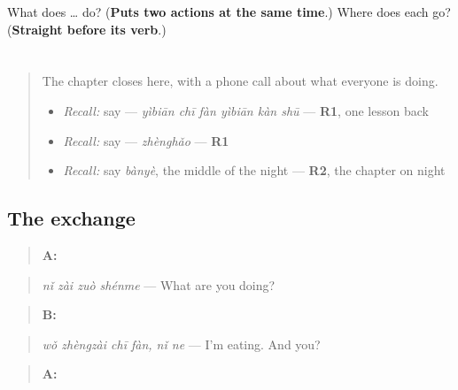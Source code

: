 \begin{tcolorbox}[breakable,colback=teal!4,colframe=teal!35!black,title={Before you move on}]
What does  …  do? (\textbf{Puts two actions at the same time}.) Where does each  go? (\textbf{Straight before its verb}.)
\end{tcolorbox}
\section[Practice]{}

\label{lesson:ZH-C149-practice}



\begin{quote}
The chapter closes here, with a phone call about what everyone is doing.

\begin{itemize}
\raggedright
  \item \emph{Recall:} say  — \emph{yìbiān chī fàn yìbiān kàn shū} — \textbf{R1}, one lesson back
  \item \emph{Recall:} say  — \emph{zhènghǎo} — \textbf{R1}
  \item \emph{Recall:} say \emph{bànyè}, the middle of the night — \textbf{R2}, the chapter on night
\end{itemize}
\end{quote}

\subsection*{The exchange}
\begin{quote}
\textbf{A:} 
\end{quote}

\begin{quote}
\emph{nǐ zài zuò shénme} — What are you doing?
\end{quote}

\begin{quote}
\textbf{B:}  
\end{quote}

\begin{quote}
\emph{wǒ zhèngzài chī fàn, nǐ ne} — I'm eating. And you?
\end{quote}

\begin{quote}
\textbf{A:} 
\end{quote}

